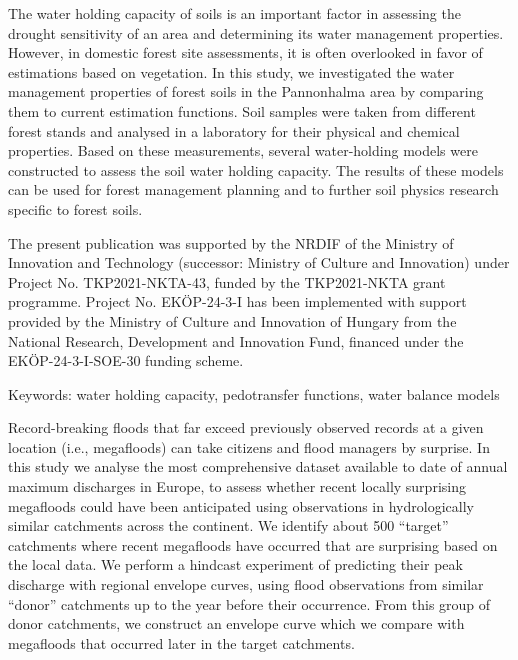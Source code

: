 \noindent

The water holding capacity of soils is an important factor in assessing the drought sensitivity of an area and determining its water management properties. However, in domestic forest site assessments, it is often overlooked in favor of estimations based on vegetation. In this study, we investigated the water management properties of forest soils in the Pannonhalma area by comparing them to current estimation functions. Soil samples were taken from different forest stands and analysed in a laboratory for their physical and chemical properties. Based on these measurements, several water-holding models were constructed to assess the soil water holding capacity. The results of these models can be used for forest management planning and to further soil physics research specific to forest soils. 

The present publication was supported by the NRDIF of the Ministry of Innovation and Technology (successor: Ministry of Culture and Innovation) under Project No. TKP2021-NKTA-43, funded by the TKP2021-NKTA grant programme. Project No. EKÖP-24-3-I has been implemented with support provided by the Ministry of Culture and Innovation of Hungary from the National Research, Development and Innovation Fund, financed under the EKÖP-24-3-I-SOE-30 funding scheme.

Keywords: water holding capacity, pedotransfer functions, water balance models
\newpage{}
{}
\begin{flushleft}





\end{flushleft}

\noindent

Record-breaking floods that far exceed previously observed records at a given location (i.e., megafloods) can take citizens and flood managers by surprise. In this study we analyse the most comprehensive dataset available to date of annual maximum discharges in Europe, to assess whether recent locally surprising megafloods could have been anticipated using observations in hydrologically similar catchments across the continent. We identify about 500 “target” catchments where recent megafloods have occurred that are surprising based on the local data. We perform a hindcast experiment of predicting their peak discharge with regional envelope curves, using flood observations from similar “donor” catchments up to the year before their occurrence. From this group of donor catchments, we construct an envelope curve which we compare with megafloods that occurred later in the target catchments. 

